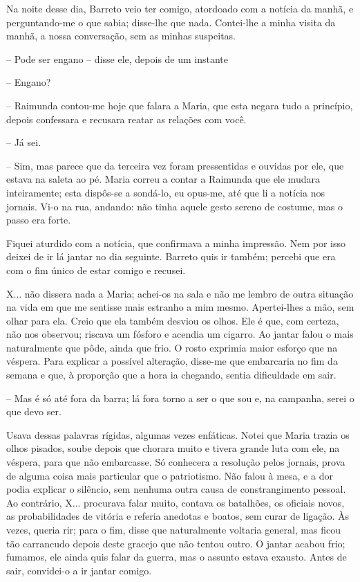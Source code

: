 Na noite desse dia, Barreto veio ter comigo, atordoado com a notícia da
manhã, e perguntando-me o que sabia; disse-lhe que nada. Contei-lhe a
minha visita da manhã, a nossa conversação, sem as minhas suspeitas.

-- Pode ser engano -- disse ele, depois de um instante

-- Engano?

-- Raimunda contou-me hoje que falara a Maria, que esta negara tudo a
princípio, depois confessara e recusara reatar as relações com você.

-- Já sei.

-- Sim, mas parece que da terceira vez foram pressentidas e ouvidas por
ele, que estava na saleta ao pé. Maria correu a contar a Raimunda que
ele mudara inteiramente; esta dispôs-se a sondá-lo, eu opus-me, até que
li a notícia nos jornais. Vi-o na rua, andando: não tinha aquele gesto
sereno de costume, mas o passo era forte.

Fiquei aturdido com a notícia, que confirmava a minha impressão. Nem por
isso deixei de ir lá jantar no dia seguinte. Barreto quis ir também;
percebi que era com o fim único de estar comigo e recusei.

X... não dissera nada a Maria; achei-os na sala e não me lembro de outra
situação na vida em que me sentisse mais estranho a mim mesmo.
Apertei-lhes a mão, sem olhar para ela. Creio que ela também desviou os
olhos. Ele é que, com certeza, não nos observou; riscava um fósforo e
acendia um cigarro. Ao jantar falou o mais naturalmente que pôde, ainda
que frio. O rosto exprimia maior esforço que na véspera. Para explicar a
possível alteração, disse-me que embarcaria no fim da semana e que, à
proporção que a hora ia chegando, sentia dificuldade em sair.

-- Mas é só até fora da barra; lá fora torno a ser o que sou e, na
campanha, serei o que devo ser.

Usava dessas palavras rígidas, algumas vezes enfáticas. Notei que Maria
trazia os olhos pisados, soube depois que chorara muito e tivera grande
luta com ele, na véspera, para que não embarcasse. Só conhecera a
resolução pelos jornais, prova de alguma coisa mais particular que o
patriotismo. Não falou à mesa, e a dor podia explicar o silêncio, sem
nenhuma outra causa de constrangimento pessoal. Ao contrário, X...
procurava falar muito, contava os batalhões, os oficiais novos, as
probabilidades de vitória e referia anedotas e boatos, sem curar de
ligação. Às vezes, queria rir; para o fim, disse que naturalmente
voltaria general, mas ficou tão carrancudo depois deste gracejo que não
tentou outro. O jantar acabou frio; fumamos, ele ainda quis falar da
guerra, mas o assunto estava exausto. Antes de sair, convidei-o a ir
jantar comigo.

